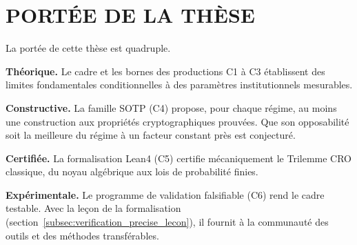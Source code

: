 \section{PORT\'EE DE LA TH\`ESE}
\label{sec:cg_portee}
\begin{sloppypar}

La port\'ee de cette th\`ese est quadruple.

\textbf{Th\'eorique.} Le cadre et les bornes des productions C1 \`a C3 \'etablissent des limites
fondamentales conditionnelles \`a des param\`etres institutionnels
mesurables.

\textbf{Constructive.} La famille SOTP (C4) propose, pour chaque r\'egime, au moins une
construction aux propri\'et\'es cryptographiques prouv\'ees. Que son opposabilit\'e soit
la meilleure du r\'egime \`a un facteur constant pr\`es est conjectur\'e.

\textbf{Certifi\'ee.} La formalisation Lean4 (C5) certifie
m\'ecaniquement le Trilemme CRO classique, du noyau alg\'ebrique aux lois de probabilit\'e finies.

\textbf{Exp\'erimentale.} Le programme de validation falsifiable (C6) rend le cadre
testable. Avec la le\c{c}on de la formalisation
(section~\ref{subsec:verification_precise_lecon}), il fournit \`a la
communaut\'e des outils et des m\'ethodes transf\'erables.

\end{sloppypar}

